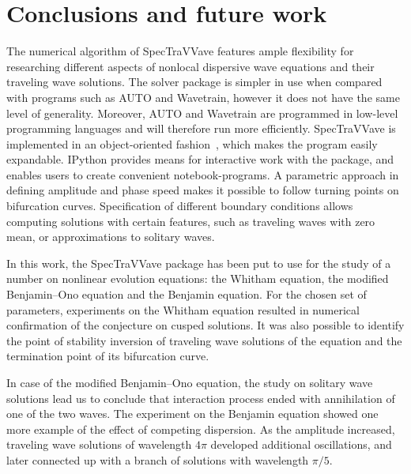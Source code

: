 

\section{Conclusions and future work}
\label{sec:conclusion}

The numerical algorithm of \textsf{SpecTraVVave} features ample flexibility for researching 
different aspects of nonlocal dispersive wave equations and their traveling wave solutions.
The solver package is simpler in use when compared with programs such as \textsf{AUTO} and 
\textsf{Wavetrain}, however it does not have the same level of generality. 
Moreover, \textsf{AUTO} and \textsf{Wavetrain} are programmed in low-level programming languages
and will therefore run more efficiently.
\textsf{SpecTraVVave} is implemented in an object-oriented fashion~\cite{PyBook}, 
which makes the program easily expandable.
\textsf{IPython} provides means for interactive work with the package, 
and enables users to create convenient notebook-programs.
A parametric approach in defining amplitude and phase speed makes it possible to follow
turning points on bifurcation curves. Specification of different boundary conditions allows 
computing solutions with certain features, such as traveling waves with zero mean, 
or approximations to solitary waves. 


In this work, the \textsf{SpecTraVVave} package has been put to use for the study of 
a number on nonlinear evolution equations: the Whitham equation, the modified Benjamin--Ono equation
and the Benjamin equation.
For the chosen set of parameters, experiments on the Whitham equation resulted in numerical 
confirmation of the conjecture on cusped solutions. It was also possible to identify the point of stability 
inversion of traveling wave solutions of the equation and the termination point of its bifurcation curve.

In case of the modified Benjamin--Ono equation, the study on solitary wave solutions lead us to conclude that 
interaction process ended with annihilation of one of the two waves. 
The experiment on the Benjamin equation showed one more example of the effect of competing dispersion.
As the amplitude increased, traveling wave solutions of wavelength $4\pi$ developed
additional oscillations, and later connected up with a branch of solutions with
wavelength $\pi/5$.


